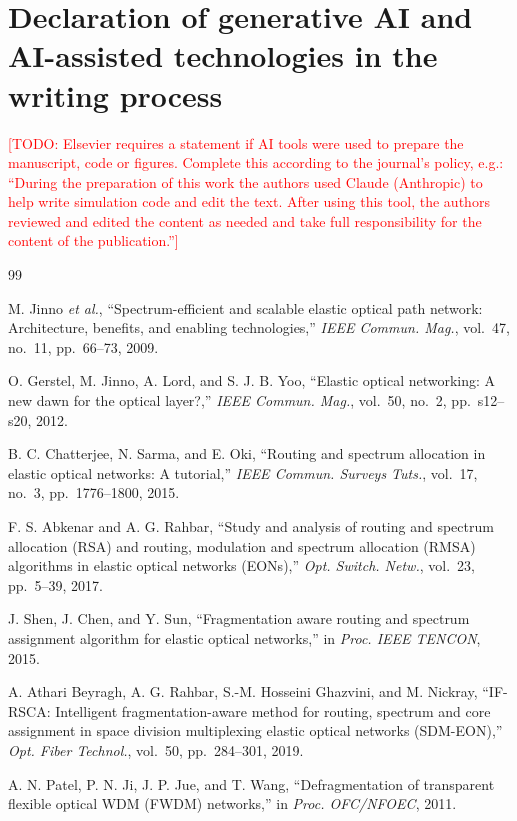 \documentclass[preprint,12pt]{elsarticle}
\newcommand{\todo}[1]{\textcolor{red}{[TODO: #1]}}
\begin{document}
\section*{Declaration of generative AI and AI-assisted technologies in the writing process}
\todo{Elsevier requires a statement if AI tools were used to prepare the manuscript, code or figures. Complete this according to the journal's policy, e.g.: ``During the preparation of this work the authors used Claude (Anthropic) to help write simulation code and edit the text. After using this tool, the authors reviewed and edited the content as needed and take full responsibility for the content of the publication.''}



\begin{thebibliography}{99}

M. Jinno \textit{et al.}, ``Spectrum-efficient and scalable elastic optical path network: Architecture, benefits, and enabling technologies,'' \textit{IEEE Commun. Mag.}, vol.~47, no.~11, pp.~66--73, 2009.

O. Gerstel, M. Jinno, A. Lord, and S. J. B. Yoo, ``Elastic optical networking: A new dawn for the optical layer?,'' \textit{IEEE Commun. Mag.}, vol.~50, no.~2, pp.~s12--s20, 2012.

B. C. Chatterjee, N. Sarma, and E. Oki, ``Routing and spectrum allocation in elastic optical networks: A tutorial,'' \textit{IEEE Commun. Surveys Tuts.}, vol.~17, no.~3, pp.~1776--1800, 2015.

F. S. Abkenar and A. G. Rahbar, ``Study and analysis of routing and spectrum allocation (RSA) and routing, modulation and spectrum allocation (RMSA) algorithms in elastic optical networks (EONs),'' \textit{Opt. Switch. Netw.}, vol.~23, pp.~5--39, 2017.

J. Shen, J. Chen, and Y. Sun, ``Fragmentation aware routing and spectrum assignment algorithm for elastic optical networks,'' in \textit{Proc. IEEE TENCON}, 2015.

A. Athari Beyragh, A. G. Rahbar, S.-M. Hosseini Ghazvini, and M. Nickray, ``IF-RSCA: Intelligent fragmentation-aware method for routing, spectrum and core assignment in space division multiplexing elastic optical networks (SDM-EON),'' \textit{Opt. Fiber Technol.}, vol.~50, pp.~284--301, 2019.

A. N. Patel, P. N. Ji, J. P. Jue, and T. Wang, ``Defragmentation of transparent flexible optical WDM (FWDM) networks,'' in \textit{Proc. OFC/NFOEC}, 2011.


\end{thebibliography}
\end{document}
